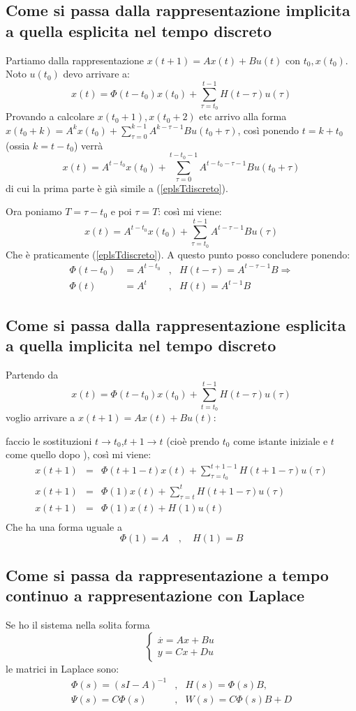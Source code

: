 \documentclass{article}
\begin{document}
\subsection{Come si passa dalla rappresentazione implicita a quella esplicita nel tempo discreto}
Partiamo dalla rappresentazione $x(t+1) = Ax(t)+Bu(t)$ con $t_0,x(t_0)$.
Noto $u(t_0)$ devo arrivare a: 
\begin{equation}\label{eplsTdiscreto}
    x(t) = \Phi(t-t_0)x(t_0)+\sum_{\tau=t_0}^{t-1}H(t-\tau)u(\tau)
\end{equation}
Provando a calcolare $x(t_0+1),x(t_0+2)$ etc arrivo alla forma
$x(t_0+k) = A^kx(t_0)+\sum_{\tau = 0}^{k-1}A^{k-\tau-1}B u(t_0+\tau)$,
così ponendo $t=k+t_0$ (ossia $k=t-t_0$) verrà
\[
x(t) =A^{t-t_0}x(t_0) +\sum_{\tau=0}^{t-t_0-1}A^{t-t_0-\tau-1}B u(t_0+\tau)   
\]
di cui la prima parte è già simile a (\ref{eplsTdiscreto}).

Ora poniamo $T = \tau-t_0$ e poi $\tau=T$: così mi viene:
\[
    x(t) =A^{t-t_0}x(t_0)+\sum_{\tau=t_0}^{t-1}A^{t-\tau-1}Bu(\tau)
\]
Che è praticamente (\ref{eplsTdiscreto}). A questo punto posso concludere ponendo:
\begin{align*}
\Phi(t-t_0)&=A^{t-t_0} &,& H(t-\tau) = A^{t-\tau-1}B \Longrightarrow\\
\Phi(t) &= A^t &,&H(t)= A^{t-1}B
\end{align*}


\subsection{Come si passa dalla rappresentazione esplicita a quella implicita nel tempo discreto}

Partendo da
\[
    x(t) = \Phi(t-t_0)x(t_0)+\sum_{t=t_0}^{t-1}H(t-\tau)u(\tau)
\]
voglio arrivare a $x(t+1) = Ax(t)+Bu(t)$: 

faccio le sostituzioni $t\to t_0$,$t+1\to t$ (cioè prendo $t_0$ come istante iniziale e $t$ come quello dopo ),
così mi viene:
\begin{align*}
    x(t+1) &=& \Phi(t+1-t)x(t)+\sum_{\tau=t_0}^{t+1-1}H(t+1-\tau)u(\tau)\\
    x(t+1) &=& \Phi(1)x(t)+\sum_{\tau=t}^{t}H(t+1-\tau)u(\tau)\\
    x(t+1) &=& \Phi(1)x(t) +H(1)u(t)\\
\end{align*}
Che ha una forma uguale a
\[\Phi(1) =A \quad,\quad H(1)=B\]



\subsection{Come si passa da rappresentazione a tempo continuo a rappresentazione con Laplace}
Se ho il sistema nella solita forma
\[\begin{cases}\overset{\cdot}{x} = Ax+Bu\\y = Cx+Du \end{cases}\]
le matrici in Laplace sono:
\begin{align*}
     \Phi(s) = (sI-A)^{-1}&,&  H(s) = \Phi(s)B,\\
     \Psi(s) = C \Phi(s)&,& W(s)=C\Phi(s)B+D 
\end{align*}
\end{document}
